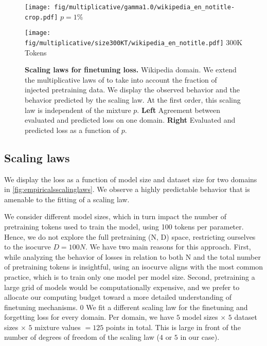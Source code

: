 \begin{figure*}[!ht]
    \centering
    \begin{minipage}{0.49\textwidth}
        \centering
        \texttt{[image: fig/multiplicative/gamma1.0/wikipedia\_en\_notitle-crop.pdf]}
        $p = 1\%$
        \label{fig:wikipedia_gamma}
    \end{minipage}
    \begin{minipage}{0.49\textwidth}
        \centering
        \texttt{[image: fig/multiplicative/size300KT/wikipedia\_en\_notitle.pdf]}
        300K Tokens
        \label{fig:dm_mathematics_size}
    \end{minipage}
    \caption{\textbf{Scaling laws for finetuning loss.} Wikipedia domain. We extend the multiplicative laws of \citet{zhang2024when} to take into account the fraction of injected pretraining data.
    We display the observed behavior and the behavior predicted by the scaling law. At the first order, this scaling law is independent of the mixture $p$. \textbf{Left} Agreement between evaluated and predicted loss on one domain. \textbf{Right} Evaluated and predicted loss as a function of $p$.}
    \label{fig:finetunescalinglaw}
\end{figure*}

\subsection{Scaling laws}
We display the loss as a function of model size and dataset size for two domains in \autoref{fig:empiricalsscalinglaws}. 
We observe a highly predictable behavior that is amenable to the fitting of a scaling law.

We consider different model sizes, which in turn impact the number of pretraining tokens used to train the model, using 100 tokens per parameter. 
Hence, we do not explore the full pretraining (N, D) space, restricting ourselves to the isocurve $D=100N$.
We have two main reasons for this approach. First, while analyzing the behavior of losses in relation to both N and the total number of pretraining tokens is insightful, using an isocurve aligns with the most common practice, which is to train only one model per model size. Second, pretraining a large grid of models would be computationally expensive, and we prefer to allocate our computing budget toward a more detailed understanding of finetuning mechanisms.
  0
We fit a different scaling law for the finetuning and forgetting loss for every domain. Per domain, we have $5$ model sizes $\times$  $5$ dataset sizes $\times$  $5$ mixture values $= 125$ points in total. This is large in front of the number of degrees of freedom of the scaling law ($4$ or $5$ in our case).


